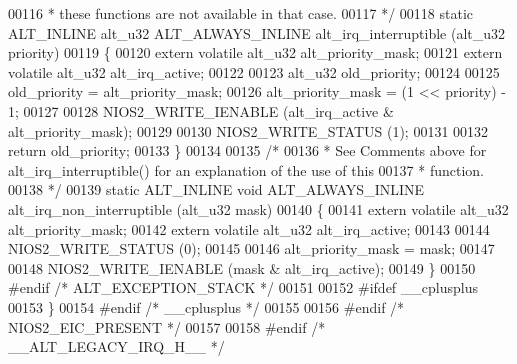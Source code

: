 \begin{DoxyCode}
00116 \textcolor{comment}{ * these functions are not available in that case.}
00117 \textcolor{comment}{ */}
00118 \textcolor{keyword}{static} ALT_INLINE alt_u32 ALT_ALWAYS_INLINE alt_irq_interruptible (alt_u32 priority)
00119 \{
00120   \textcolor{keyword}{extern} \textcolor{keyword}{volatile} alt_u32 alt_priority_mask;
00121   \textcolor{keyword}{extern} \textcolor{keyword}{volatile} alt_u32 alt_irq_active;
00122 
00123   alt_u32 old\_priority;
00124 
00125   old\_priority      = alt_priority_mask;
00126   alt\_priority\_mask = (1 << priority) - 1;
00127 
00128   NIOS2_WRITE_IENABLE (alt\_irq\_active & alt\_priority\_mask);
00129 
00130   NIOS2_WRITE_STATUS (1);
00131 
00132   \textcolor{keywordflow}{return} old\_priority; 
00133 \}
00134 
00135 \textcolor{comment}{/*}
00136 \textcolor{comment}{ * See Comments above for alt\_irq\_interruptible() for an explanation of the use of this}
00137 \textcolor{comment}{ * function.}
00138 \textcolor{comment}{ */}
00139 \textcolor{keyword}{static} ALT_INLINE \textcolor{keywordtype}{void} ALT_ALWAYS_INLINE alt_irq_non_interruptible (alt_u32 mask)
00140 \{
00141   \textcolor{keyword}{extern} \textcolor{keyword}{volatile} alt_u32 alt_priority_mask;
00142   \textcolor{keyword}{extern} \textcolor{keyword}{volatile} alt_u32 alt_irq_active;
00143 
00144   NIOS2_WRITE_STATUS (0);  
00145 
00146   alt\_priority\_mask = mask;
00147 
00148   NIOS2_WRITE_IENABLE (mask & alt\_irq\_active);  
00149 \}
00150 \textcolor{preprocessor}{#endif }\textcolor{comment}{/* ALT\_EXCEPTION\_STACK */}\textcolor{preprocessor}{}
00151 
00152 \textcolor{preprocessor}{#ifdef \_\_cplusplus}
00153 \}
00154 \textcolor{preprocessor}{#endif }\textcolor{comment}{/* \_\_cplusplus */}\textcolor{preprocessor}{}
00155 
00156 \textcolor{preprocessor}{#endif }\textcolor{comment}{/* NIOS2\_EIC\_PRESENT */}\textcolor{preprocessor}{}
00157 
00158 \textcolor{preprocessor}{#endif }\textcolor{comment}{/* \_\_ALT\_LEGACY\_IRQ\_H\_\_ */}\textcolor{preprocessor}{}
\end{DoxyCode}
